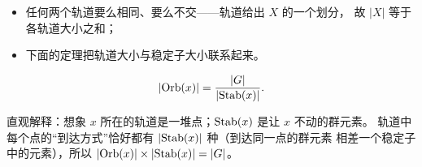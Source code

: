 \begin{itemize}[leftmargin=1.3em,itemsep=2pt]
  \item 任何两个轨道要么相同、要么不交——轨道给出 $X$ 的一个划分，
        故 $|X|$ 等于各轨道大小之和；
  \item 下面的定理把轨道大小与稳定子大小联系起来。
\end{itemize}

\begin{theorem}[轨道与稳定子定理]
\[
  |\mathrm{Orb}(x)| = \frac{|G|}{|\mathrm{Stab}(x)|}.
\]
\end{theorem}

\begin{strand}
直观解释：想象 $x$ 所在的轨道是一堆点；$\mathrm{Stab}(x)$ 是让 $x$ 不动的群元素。
轨道中每个点的“到达方式”恰好都有 $|\mathrm{Stab}(x)|$ 种（到达同一点的群元素
相差一个稳定子中的元素），所以 $|\mathrm{Orb}(x)|\times|\mathrm{Stab}(x)| = |G|$。
\end{strand}
